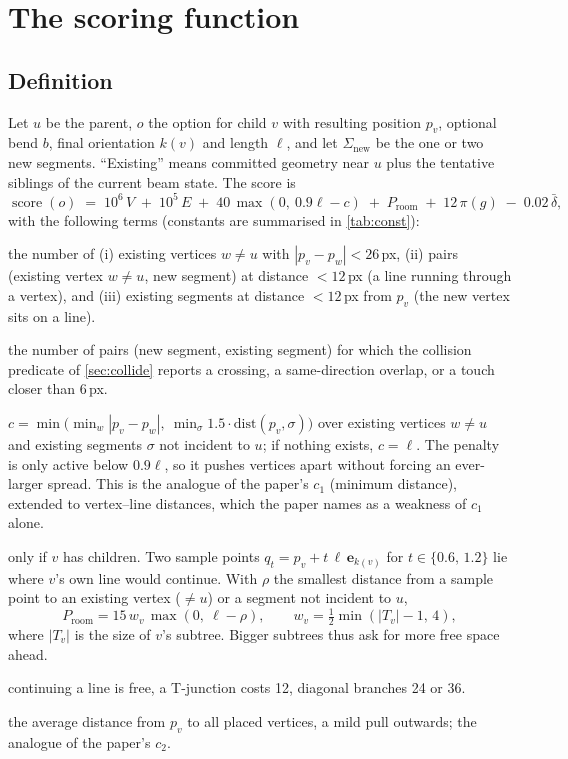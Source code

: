 \documentclass[11pt,a4paper]{article}
\newcommand{\dirv}[1]{\mathbf{e}_{#1}}
\newcommand{\len}{\ell}
\newcommand{\Score}{\operatorname{score}}
\begin{document}
\section{The scoring function}
\label{sec:score}

\subsection{Definition}

Let $u$ be the parent, $o$ the option for child $v$ with resulting position $p_v$, optional bend $b$, final orientation $k(v)$ and length $\len$, and let $\Sigma_{\text{new}}$ be the one or two new segments. ``Existing'' means committed geometry near $u$ plus the tentative siblings of the current beam state. The score is
\[
  \Score(o) \;=\; 10^6\,V \;+\; 10^5\,E \;+\; 40\,\max(0,\ 0.9\len - c) \;+\; P_{\text{room}} \;+\; 12\,\pi(g) \;-\; 0.02\,\bar\delta,
\]
with the following terms (constants are summarised in \cref{tab:const}):

\begin{description}[leftmargin=1.2em, style=nextline]
\item[$V$ -- vertex conflicts] the number of
  (i) existing vertices $w\neq u$ with $|p_v-p_w|<26$\,px,
  (ii) pairs (existing vertex $w\neq u$, new segment) at distance $<12$\,px (a line running through a vertex), and
  (iii) existing segments at distance $<12$\,px from $p_v$ (the new vertex sits on a line).
\item[$E$ -- edge conflicts] the number of pairs (new segment, existing segment) for which the collision predicate of \cref{sec:collide} reports a crossing, a same-direction overlap, or a touch closer than 6\,px.
\item[$c$ -- clearance] $c=\min\bigl(\min_w |p_v-p_w|,\ \min_\sigma 1.5\cdot\mathrm{dist}(p_v,\sigma)\bigr)$ over existing vertices $w\neq u$ and existing segments $\sigma$ not incident to $u$; if nothing exists, $c=\len$. The penalty is only active below $0.9\len$, so it pushes vertices apart without forcing an ever-larger spread. This is the analogue of the paper's $c_1$ (minimum distance), extended to vertex--line distances, which the paper names as a weakness of $c_1$ alone.
\item[$P_{\text{room}}$ -- look-ahead] only if $v$ has children. Two sample points $q_t=p_v+t\,\len\,\dirv{k(v)}$ for $t\in\{0.6,\,1.2\}$ lie where $v$'s own line would continue. With $\rho$ the smallest distance from a sample point to an existing vertex ($\neq u$) or a segment not incident to $u$,
  \[ P_{\text{room}} = 15\, w_v\,\max(0,\ \len-\rho),\qquad w_v=\tfrac12\min(|T_v|-1,\,4), \]
  where $|T_v|$ is the size of $v$'s subtree. Bigger subtrees thus ask for more free space ahead.
\item[$12\,\pi(g)$ -- metro preference] continuing a line is free, a T-junction costs 12, diagonal branches 24 or 36.
\item[$\bar\delta$ -- spread] the average distance from $p_v$ to all placed vertices, a mild pull outwards; the analogue of the paper's $c_2$.
\end{description}
\end{document}
